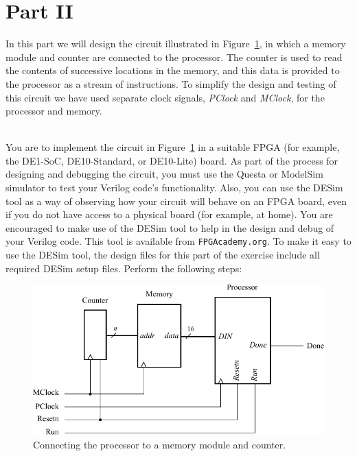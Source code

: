 \documentclass[epsfig,10pt,fullpage]{article} \addtolength{\textwidth}{1.5in}
\begin{document}
\section*{Part II}
In this part we will design the circuit illustrated in Figure~\ref{fig:fig4}, in which a 
memory module and counter are connected to the processor. The
counter is used to read the contents of successive locations in the memory, and
this data is provided to the processor as a stream of instructions. To simplify the
design and testing of this circuit we have used separate clock signals, {\it PClock} 
and {\it MClock}, for the processor and memory. 

~\\
You are to implement the circuit in Figure~\ref{fig:fig4} in a suitable FPGA (for example, 
the DE1-SoC, DE10-Standard, or DE10-Lite) board. As part of the process for designing and 
debugging the circuit, you must use the Questa or ModelSim simulator to test your 
Verilog code's functionality. Also, you can use the DESim tool as a way of 
observing how your circuit will behave on an FPGA board, even if you do not have access to 
a physical board (for example, at home). You are encouraged to make use of the
DESim tool to help in the design and debug of your Verilog code. This tool is available
from \texttt{FPGAcademy.org}. To make it easy to use the DESim tool, the design files for 
this part of the exercise include all required DESim setup files. Perform the following steps:

\begin{figure}[h]
	\begin{center}
		\includegraphics[]{figures/figure4.pdf}
	\end{center}
	\caption{Connecting the processor to a memory module and counter.}
	\label{fig:fig4}
\end{figure}
\end{document}
